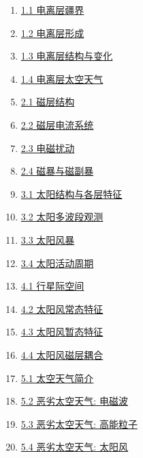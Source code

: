 \documentclass[11pt]{article}
\begin{document}
\begin{multicols}{2}
	\begin{enumerate}
		\item \href{https://mp.weixin.qq.com/s/eK0nObBkQutQ9zAjrz80PA}{1.1 电离层疆界}	%
		\item \href{https://mp.weixin.qq.com/s/D2sNpX-NeaNjmxB5CKMKiA}{1.2 电离层形成}	%
		\item \href{https://mp.weixin.qq.com/s/xZXJguIX6GNszkl5O_f01A}{1.3 电离层结构与变化}	%
		\item \href{https://mp.weixin.qq.com/s/arRHBqHz29F1Pmlp-EHtKg}{1.4 电离层太空天气}	%
		\item \href{https://mp.weixin.qq.com/s/3foK4NzfZ1Oedc01BJjnNA}{2.1 磁层结构}	%
		\item \href{https://mp.weixin.qq.com/s/EBXORVtcW4AxE8av7WJ8Gw}{2.2 磁层电流系统}	%
		\item \href{https://mp.weixin.qq.com/s/N8EQatE7tGxsj-ukNU3dyA}{2.3 电磁扰动}	%
		\item \href{https://mp.weixin.qq.com/s/dwUoYdEfVI8kJXSF2_cwhQ}{2.4 磁暴与磁副暴}	%
		\item \href{https://mp.weixin.qq.com/s/6QSLqyA0P8joLc-DqHVwMg}{3.1 太阳结构与各层特征}	%
		\item \href{https://mp.weixin.qq.com/s/kiBH7URAuRg-WNuGM8EFlA}{3.2 太阳多波段观测}	%
		\item \href{https://mp.weixin.qq.com/s/bFaJwqyQkwtKfEbPF3c-1A}{3.3 太阳风暴}	%
		\item \href{https://mp.weixin.qq.com/s/366JwOJFJagZHFiG8RlM3Q}{3.4 太阳活动周期}	%
		\item \href{https://mp.weixin.qq.com/s/TI4pO-loYIajuQejAV3kmA}{4.1 行星际空间}	%
		\item \href{https://mp.weixin.qq.com/s/VApmJlfT5lk3XHiHegWWlA}{4.2 太阳风常态特征}	%
		\item \href{https://mp.weixin.qq.com/s/ZUhm97S6LIY_cQ1HlD7Qng}{4.3 太阳风暂态特征}	%
		\item \href{https://mp.weixin.qq.com/s/qSDRvEct0kAWj99qaZAtlg}{4.4 太阳风磁层耦合}	%
		\item \href{https://mp.weixin.qq.com/s/F5pJ47K2H4suopQHyj4FcQ}{5.1 太空天气简介}	%
		\item \href{https://mp.weixin.qq.com/s/ejFno9Aa6XF2-c4mMnvFeQ}{5.2 恶劣太空天气: 电磁波}	%
		\item \href{https://mp.weixin.qq.com/s/IIC5A08fYknX5j9F_wXHaA}{5.3 恶劣太空天气: 高能粒子}	%
		\item \href{https://mp.weixin.qq.com/s/cwbmr_qDDk7sYwl2B_i6GQ}{5.4 恶劣太空天气: 太阳风}	%
	\end{enumerate}
\end{multicols}
\end{document}
